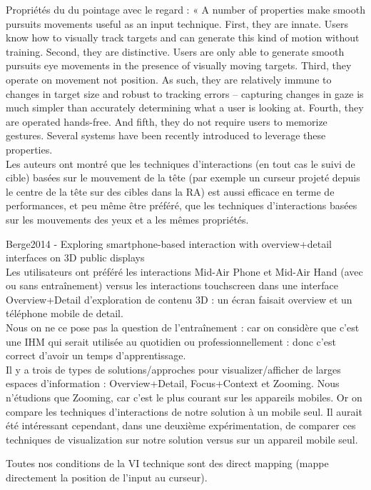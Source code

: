 Propriétés du du pointage avec le regard : « A number of properties make smooth pursuits movements useful as an input technique. First, they are innate. Users know how to visually track targets and can generate this kind of motion without training. Second, they are distinctive. Users are only able to generate smooth pursuits eye movements in the presence of visually moving targets. Third, they operate on movement not position. As such, they are relatively immune to changes in target size and robust to tracking errors – capturing changes in gaze is much simpler than accurately determining what a user is looking at. Fourth, they are operated hands-free. And fifth, they do not require users to memorize gestures. Several systems have been recently introduced to leverage these properties.\\
Les auteurs ont montré que les techniques d'interactions (en tout cas le suivi de cible) basées sur le mouvement de la tête (par exemple un curseur projeté depuis le centre de la tête sur des cibles dans la RA) est aussi efficace en terme de performances, et peu même être préféré, que les techniques d'interactions basées sur les mouvements des yeux et a les mêmes propriétés.

Berge2014 - Exploring smartphone-based interaction with overview+detail interfaces on 3D public displays\\
Les utilisateurs ont préféré les interactions Mid-Air Phone et Mid-Air Hand (avec ou sans entraînement) versus les interactions touchscreen dans une interface Overview+Detail d'exploration de contenu 3D : un écran faisait overview et un téléphone mobile de detail.\\
Nous on ne ce pose pas la question de l'entraînement : car on considère que c'est une IHM qui serait utilisée au quotidien ou professionnellement : donc c'est correct d'avoir un temps d'apprentissage.\\
Il y a trois de types de solutions/approches pour visualizer/afficher de larges espaces d'information : Overview+Detail, Focus+Context et Zooming. Nous n'étudions que Zooming, car c'est le plus courant sur les appareils mobiles. Or on compare les techniques d'interactions de notre solution à un mobile seul. Il aurait été intéressant cependant, dans une deuxième expérimentation, de comparer ces techniques de visualization sur notre solution versus sur un appareil mobile seul.

Toutes nos conditions de la VI technique sont des direct mapping (mappe directement la position de l'input au curseur).


